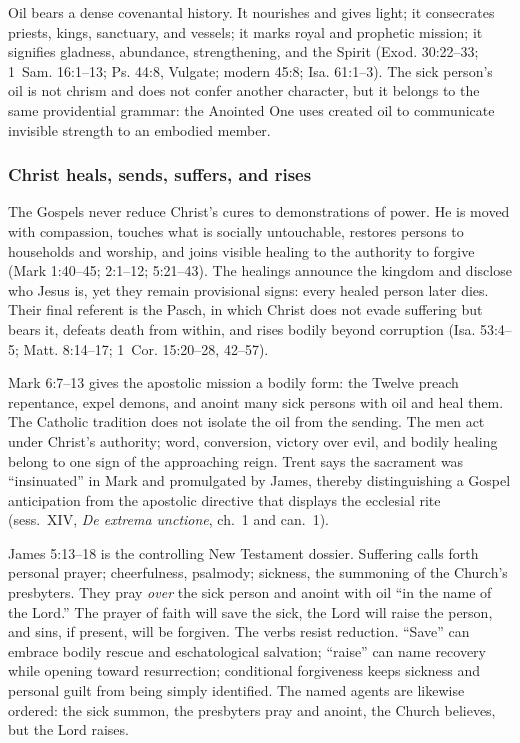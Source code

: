 Oil bears a dense covenantal history. It nourishes and gives light; it consecrates priests, kings, sanctuary, and vessels; it marks royal and prophetic mission; it signifies gladness, abundance, strengthening, and the Spirit (Exod. 30:22--33; 1~Sam. 16:1--13; Ps. 44:8, Vulgate; modern 45:8; Isa. 61:1--3). The sick person's oil is not chrism and does not confer another character, but it belongs to the same providential grammar: the Anointed One uses created oil to communicate invisible strength to an embodied member.

\subsubsection{Christ heals, sends, suffers, and rises}

The Gospels never reduce Christ's cures to demonstrations of power. He is moved with compassion, touches what is socially untouchable, restores persons to households and worship, and joins visible healing to the authority to forgive (Mark 1:40--45; 2:1--12; 5:21--43). The healings announce the kingdom and disclose who Jesus is, yet they remain provisional signs: every healed person later dies. Their final referent is the Pasch, in which Christ does not evade suffering but bears it, defeats death from within, and rises bodily beyond corruption (Isa. 53:4--5; Matt. 8:14--17; 1~Cor. 15:20--28, 42--57).

Mark 6:7--13 gives the apostolic mission a bodily form: the Twelve preach repentance, expel demons, and anoint many sick persons with oil and heal them. The Catholic tradition does not isolate the oil from the sending. The men act under Christ's authority; word, conversion, victory over evil, and bodily healing belong to one sign of the approaching reign. Trent says the sacrament was ``insinuated'' in Mark and promulgated by James, thereby distinguishing a Gospel anticipation from the apostolic directive that displays the ecclesial rite (sess.~XIV, \emph{De extrema unctione}, ch.~1 and can.~1).

James 5:13--18 is the controlling New Testament dossier. Suffering calls forth personal prayer; cheerfulness, psalmody; sickness, the summoning of the Church's presbyters. They pray \emph{over} the sick person and anoint with oil ``in the name of the Lord.'' The prayer of faith will save the sick, the Lord will raise the person, and sins, if present, will be forgiven. The verbs resist reduction. ``Save'' can embrace bodily rescue and eschatological salvation; ``raise'' can name recovery while opening toward resurrection; conditional forgiveness keeps sickness and personal guilt from being simply identified. The named agents are likewise ordered: the sick summon, the presbyters pray and anoint, the Church believes, but the Lord raises.

